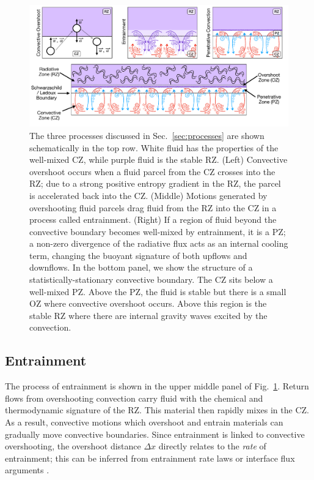 \begin{figure}[t]
\centering
\includegraphics[width=\textwidth]{processes_and_structure_figure.pdf}
\caption{
    The three processes discussed in Sec.~\ref{sec:processes} are shown schematically in the top row.
    White fluid has the properties of the well-mixed CZ, while purple fluid is the stable RZ.
    (Left) Convective overshoot occurs when a fluid parcel from the CZ crosses into the RZ; due to a strong positive entropy gradient in the RZ, the parcel is accelerated back into the CZ.
    (Middle) Motions generated by overshooting fluid parcels drag fluid from the RZ into the CZ in a process called entrainment.
    (Right) If a region of fluid beyond the convective boundary becomes well-mixed by entrainment, it is a PZ; a non-zero divergence of the radiative flux acts as an internal cooling term, changing the buoyant signature of both upflows and downflows.
    In the bottom panel, we show the structure of a statistically-stationary convective boundary.
    The CZ sits below a well-mixed PZ.
    Above the PZ, the fluid is stable but there is a small OZ where convective overshoot occurs.
    Above this region is the stable RZ where there are internal gravity waves excited by the convection.
\label{fig:schema}
}
\end{figure}





\subsection{Entrainment}
The process of entrainment is shown in the upper middle panel of Fig.~\ref{fig:schema}.
Return flows from overshooting convection carry fluid with the chemical and thermodynamic signature of the RZ.
This material then rapidly mixes in the CZ.
As a result, convective motions which overshoot and entrain materials can gradually move convective boundaries.
Since entrainment is linked to convective overshooting, the overshoot distance $\Delta x$ directly relates to the \emph{rate} of entrainment; this can be inferred from entrainment rate laws \citep{meakin_arnett_2007} or interface flux arguments \citep{fuentes_cumming_2020}.


